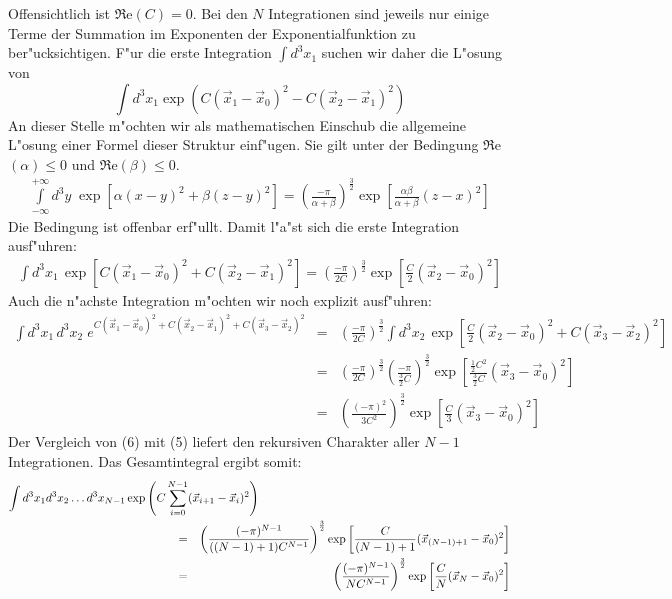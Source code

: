 \documentclass[11pt,a4paper]{article}
\begin{document}
Offensichtlich ist $\Re$e$(C)=0$. Bei den $N$ Integrationen sind jeweils nur einige Terme der Summation im Exponenten der Exponentialfunktion zu ber"ucksichtigen. F"ur die erste Integration $\int d^3x_1$ suchen wir daher die L"osung von 
\[ \int d^3x_1 \exp \left(C(\vec{x}_1-\vec{x}_0)^2 - C(\vec{x}_2 - \vec{x}_1)^2 \right)\]
An dieser Stelle m"ochten wir als mathematischen Einschub die allgemeine L"osung einer Formel dieser Struktur einf"ugen. Sie gilt unter der Bedingung $\Re$e$(\alpha)\le0$ und $\Re$e$(\beta)\le0$.
\begin{eqnarray}
\int\limits_{-\infty}^{+\infty} d^3y \; \exp \left[\alpha(x-y)^2 + \beta(z-y)^2 \right] = \left(\frac{-\pi}{\alpha  + \beta}\right)^\frac{3}{2} \exp \left[\frac{\alpha\beta}{\alpha + \beta}(z-x)^2 \right]
\end{eqnarray}
Die Bedingung ist offenbar erf"ullt. Damit l"a"st sich die erste Integration ausf"uhren:
\begin{eqnarray}
\int d^3x_1 \, \exp \left[C(\vec{x}_1-\vec{x}_0)^2 + C(\vec{x}_2 - \vec{x}_1)^2 \right] = \left(\frac{-\pi}{2C}\right)^\frac{3}{2} \exp \left[\frac{C}{2}(\vec{x}_2-\vec{x}_0)^2 \right]
\end{eqnarray}
\newpage
Auch die n"achste Integration m"ochten wir noch explizit ausf"uhren:
\begin{eqnarray}
\int d^3x_1 \, d^3x_2 \; e^{C(\vec{x}_1-\vec{x}_0)^2 + C(\vec{x}_2 - \vec{x}_1)^2 + C(\vec{x}_3 - \vec{x}_2)^2}  & = & \left(\frac{-\pi}{2C}\right)^\frac{3}{2} \int d^3x_2 \, \exp \left[\frac{C}{2}(\vec{x}_2-\vec{x}_0)^2 + C(\vec{x}_3 - \vec{x}_2)^2 \right]\nonumber\\ & = & \left(\frac{-\pi}{2C}\right)^\frac{3}{2} \left(\frac{-\pi}{\frac{3}{2}C}\right)^\frac{3}{2} \exp \left[\frac{\frac{1}{2}C^2}{\frac{3}{2}C}(\vec{x}_3-\vec{x}_0)^2 \right]\nonumber\\ & = & \left(\frac{(-\pi)^2}{3C^2}\right)^\frac{3}{2} \exp \left[\frac{C}{3}(\vec{x}_3-\vec{x}_0)^2 \right]
\end{eqnarray}
Der Vergleich von (6) mit (5) liefert den rekursiven Charakter aller $N-1$ Integrationen. Das Gesamt\-integral ergibt somit:
\begin{eqnarray}
\lefteqn{\int d^3x_1 d^3x_2 \ldots d^3x_{N-1} \exp\left(C\sum_{i=0}^{N-1}(\vec{x}_{i+1}-\vec{x}_i)^2\right) } \hspace{5cm} \nonumber\\ & = & \left( \frac{(-\pi)^{N-1}}{((N-1)+1)C^{N-1}} \right)^\frac{3}{2} \exp\left[\frac{C}{(N-1)+1}(\vec{x}_{(N-1)+1} - \vec{x}_0)^2\right]\nonumber\\& = & \left( \frac{(-\pi)^{N-1}}{NC^{N-1}} \right)^\frac{3}{2} \exp\left[\frac{C}{N}(\vec{x}_{N} - \vec{x}_0)^2\right]
\end{eqnarray}
\end{document}
